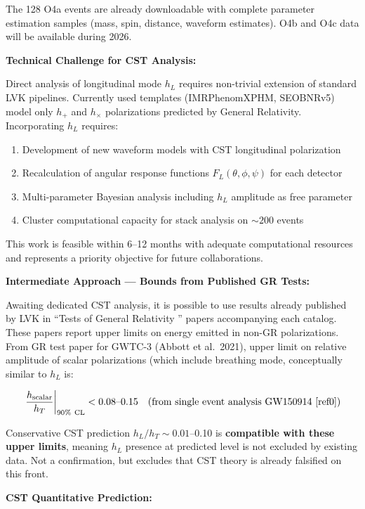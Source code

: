 \documentclass[11pt,a4paper]{article}
\providecommand{\tightlist}{\setlength{\itemsep}{0pt}\setlength{\parskip}{0pt}}
\begin{document}
The 128 O4a events are already downloadable with complete parameter
estimation samples (mass, spin, distance, waveform estimates). O4b and
O4c data will be available during 2026.

\textbf{Technical Challenge for CST Analysis:}

Direct analysis of longitudinal mode \(h_L\) requires non-trivial
extension of standard LVK pipelines. Currently used templates
(IMRPhenomXPHM, SEOBNRv5) model only \(h_+\) and \(h_\times\)
polarizations predicted by General Relativity. Incorporating \(h_L\)
requires:

\begin{enumerate}
\def\labelenumi{\arabic{enumi}.}
\tightlist
\item
  Development of new waveform models with CST longitudinal polarization
\item
  Recalculation of angular response functions \(F_L(\theta,\phi,\psi)\)
  for each detector
\item
  Multi-parameter Bayesian analysis including \(h_L\) amplitude as free
  parameter
\item
  Cluster computational capacity for stack analysis on \(\sim 200\)
  events
\end{enumerate}

This work is feasible within 6--12 months with adequate computational
resources and represents a priority objective for future collaborations.

\textbf{Intermediate Approach --- Bounds from Published GR Tests:}

Awaiting dedicated CST analysis, it is possible to use results already
published by LVK in ``Tests of General Relativity \cite{ref2}'' papers accompanying
each catalog. These papers report upper limits on energy emitted in
non-GR polarizations. From GR test paper for GWTC-3 \cite{ref1} (Abbott et
al.~2021), upper limit on relative amplitude of scalar polarizations
(which include breathing mode, conceptually similar to \(h_L\) is:

\[\left.\frac{h_{\rm scalar}}{h_T}\right|_{\rm 90\%~CL} < 0.08\text{--}0.15 \quad \text{(from single event analysis GW150914 \cite{ref0})}\]

Conservative CST prediction \(h_L/h_T \sim 0.01\)--0.10 is
\textbf{compatible with these upper limits}, meaning \(h_L\) presence at
predicted level is not excluded by existing data. Not a confirmation,
but excludes that CST theory is already falsified on this front.

\textbf{CST Quantitative Prediction:}
\end{document}
